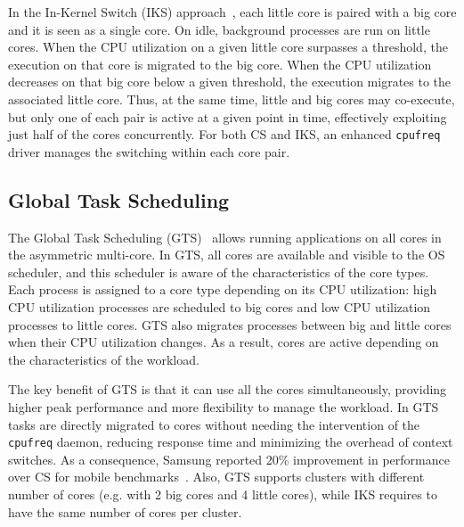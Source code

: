 In the In-Kernel Switch (IKS) approach~\cite{IKS}, each little core is paired with a big core and it is seen as a single core. On idle, background processes are run on little cores. When the CPU utilization on a given little core surpasses a threshold, the execution on that core is migrated to the big core. When the CPU utilization decreases on that big core below a given threshold, the execution migrates to the associated little core. Thus, at the same time, little and big cores may co-execute, but only one of each pair is active at a given point in time, effectively exploiting just half of the cores concurrently. For both CS and IKS, an enhanced \texttt{cpufreq} driver manages the switching within each core pair.



\subsection{Global Task Scheduling}

The Global Task Scheduling (GTS)~\cite{samsung}
allows running applications on all cores in the asymmetric multi-core. In GTS, all cores are 
available and visible to the OS scheduler, and this scheduler is aware of the characteristics of 
the core types. Each process is assigned to a core type depending on its CPU utilization:
high CPU utilization processes are scheduled to big cores and low CPU utilization processes to 
little cores. GTS also migrates processes between big and little cores when their CPU utilization 
changes. As a result, cores are active depending on the characteristics of the workload. 

The key benefit of GTS is that it can use all the cores simultaneously, providing higher peak 
performance and more flexibility to manage the workload. In GTS tasks are directly migrated to cores 
without needing the intervention of the \texttt{cpufreq} daemon, reducing response time and 
minimizing the overhead of context switches. As a consequence, Samsung reported 20\% improvement in 
performance over CS for mobile benchmarks~\cite{samsung}. Also, GTS supports clusters with 
different number of cores (e.g. with 2 big cores and 4 little cores), while IKS requires to have 
the same number of cores per cluster.

